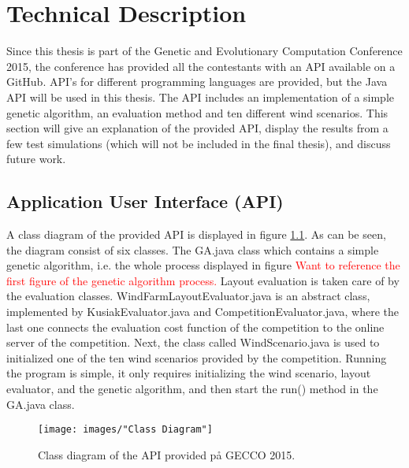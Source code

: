 \chapter{Technical Description}


Since this thesis is part of the Genetic and Evolutionary Computation Conference 2015, the conference has provided all the contestants with an API available on a GitHub. API's for different programming languages are provided, but the Java API will be used in this thesis. The API includes an implementation of a simple genetic algorithm, an evaluation method and ten different wind scenarios. This section will give an explanation of the provided API, display the results from a few test simulations (which will not be included in the final thesis), and discuss future work.


\section{Application User Interface (API)}
A class diagram of the provided API is displayed in figure \ref{Class Diagram}. As can be seen, the diagram consist of six classes. The GA.java class which contains a simple genetic algorithm, i.e. the whole process displayed in figure \textcolor{red}{Want to reference the first figure of the genetic algorithm process.} Layout evaluation is taken care of by the evaluation classes. WindFarmLayoutEvaluator.java is an abstract class, implemented by KusiakEvaluator.java and CompetitionEvaluator.java, where the last one connects the evaluation cost function of the competition to the online server of the competition. Next, the class called WindScenario.java is used to initialized one of the ten wind scenarios provided by the competition. Running the program is simple, it only requires initializing the wind scenario, layout evaluator, and the genetic algorithm, and then start the run() method in the GA.java class.


\begin{figure}[h!]
\begin{center}
\texttt{[image: images/"Class Diagram"]}
\caption{Class diagram of the API provided på GECCO 2015.}
\label{Class Diagram}
\end{center}
\end{figure}


